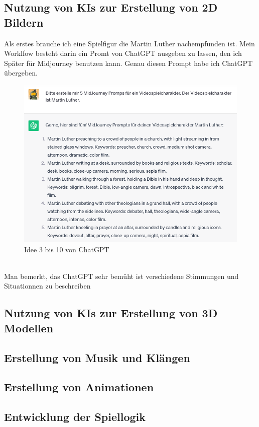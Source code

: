\documentclass[12pt,a4paper,bibliography=totocnumbered,listof=totocnumbered]{scrartcl}
\begin{document}
\subsection{Nutzung von KIs zur Erstellung von 2D Bildern}
Als erstes brauche ich eine Spielfigur die Martin Luther nachempfunden ist. Mein Worklfow besteht darin ein Promt von ChatGPT ausgeben zu lassen, den ich Später für Midjourney benutzen kann. Genau diesen Prompt habe ich ChatGPT übergeben.
\\
\begin{figure}[h]
	\centering
	\includegraphics[scale=0.7]{BilderFuerBA/ChatGPTMJML01.png}
	\caption{Idee 3 bis 10 von ChatGPT}
	\label{fig:Prompt-MJ-Fünf-Idenn}
\end{figure}
\\
Man bemerkt, das ChatGPT sehr bemüht ist verschiedene Stimmungen und Situationnen zu beschreiben
\subsection{Nutzung von KIs zur Erstellung von 3D Modellen}
\subsection{Erstellung von Musik und Klängen}
\subsection{Erstellung von Animationen}
\subsection{Entwicklung der Spiellogik}
\end{document}
